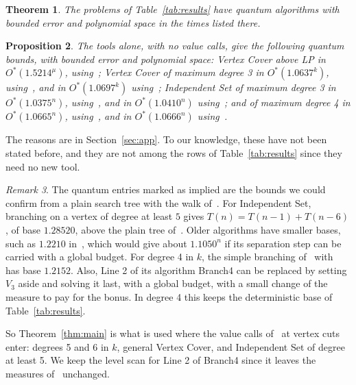 \documentclass[11pt]{article}
\newtheorem{theorem}{Theorem}[section]
\newtheorem{proposition}[theorem]{Proposition}
\theoremstyle{definition}
\theoremstyle{remark}
\newtheorem{remark}[theorem]{Remark}
\begin{document}
\begin{theorem}\label{thm:app}
The problems of Table~\ref{tab:results} have quantum algorithms with bounded error and polynomial space in the times listed there.
\end{theorem}

\begin{proposition}\label{prop:direct}
The tools alone, with no value calls, give the following quantum bounds, with bounded error and polynomial space: Vertex Cover above LP in $O^*(1.5214^\mu)$, using~\cite{Mon18,LNRRS14}; Vertex Cover of maximum degree 3 in $O^*(1.0637^k)$, using~\cite{BHMT02,CGHMZ25}, and in $O^*(1.0697^k)$ using~\cite{Mon18,LNRRS14,XN13}; Independent Set of maximum degree 3 in $O^*(1.0375^n)$, using~\cite{BHMT02,CGHMZ25}, and in $O^*(1.0410^n)$ using~\cite{Mon18,XN13}; and of maximum degree 4 in $O^*(1.0665^n)$, using~\cite{BHMT02,CGHMZ25,XN17b}, and in $O^*(1.0666^n)$ using~\cite{Mon18,XN17b}.
\end{proposition}

The reasons are in Section~\ref{sec:app}. To our knowledge, these have not been stated before, and they are not among the rows of Table~\ref{tab:results} since they need no new tool.

\begin{remark}\label{rem:baseline}
The quantum entries marked as implied are the bounds we could confirm from a plain search tree with the walk of~\cite{Mon18}. For Independent Set, branching on a vertex of degree at least $5$ gives $T(n)=T(n-1)+T(n-6)$, of base $1.28520$, above the plain tree of~\cite{XN17b}. Older algorithms have smaller bases, such as $1.2210$ in~\cite{FGK09}, which would give about $1.1050^n$ if its separation step can be carried with a global budget. For degree 4 in $k$, the simple branching of~\cite[Proposition 28]{HN24} with~\cite{XN17b} has base $1.2152$. Also, Line 2 of its algorithm Branch4 can be replaced by setting $V_3$ aside and solving it last, with a global budget, with a small change of the measure to pay for the bonus. In degree 4 this keeps the deterministic base of Table~\ref{tab:results}.

So Theorem~\ref{thm:main} is what is used where the value calls of~\cite{XN16} at vertex cuts enter: degrees 5 and 6 in $k$, general Vertex Cover, and Independent Set of degree at least 5. We keep the level scan for Line 2 of Branch4 since it leaves the measures of~\cite{HN24} unchanged.
\end{remark}
\end{document}
